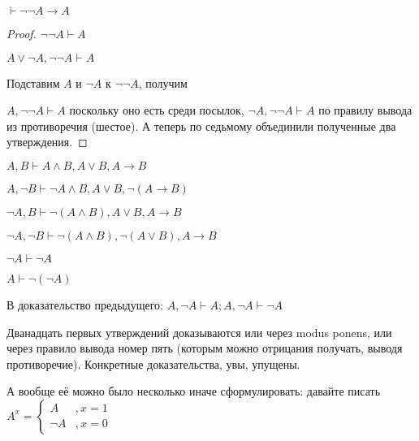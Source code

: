 
\begin{statement}
    $\vdash \lnot \lnot A \to A$
\end{statement}
\begin{proof}
    $\lnot \lnot A \vdash A$

    $A \lor \lnot A, \lnot \lnot A \vdash A$

    Подставим $A$ и $\lnot A$ к $\lnot \lnot A$, получим

    $A, \lnot \lnot A \vdash A$ поскольку оно есть среди посылок, $\lnot A, \lnot \lnot A \vdash A$ по правилу вывода из противоречия (шестое).  А теперь по седьмому объединили полученные два утверждения.
\end{proof}

\begin{lemma}
	$A, B \vdash A \land B, A \lor B, A \to B$

	$A, \lnot B \vdash \lnot A \land B, A \lor B, \lnot (A \to B)$

	$\lnot A, B \vdash \lnot(A \land B), A \lor B, A \to B$

	$\lnot A, \lnot B \vdash \lnot(A \land B), \lnot(A \lor B), A \to B$

	$\lnot A \vdash \lnot A$

	$A \vdash \lnot(\lnot A)$

	В доказательство предыдущего: $A, \lnot A \vdash A; A, \lnot A \vdash \lnot A$

	Дванадцать первых утверждений доказываются или через modus ponens, или через правило вывода номер пять (которым можно отрицания получать, выводя противоречие). Конкретные доказательства, увы, упущены.
\end{lemma}

А вообще её можно было несколько иначе сформулировать: давайте писать $A^x = \left\{\begin{aligned} A &, x = 1\\ \lnot A &, x = 0  \end{aligned} \right.$

